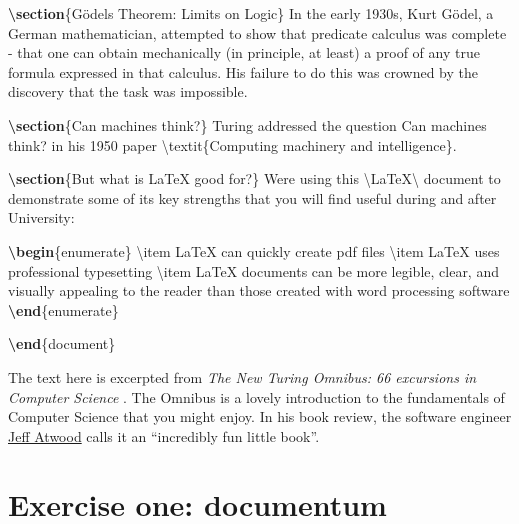 \documentclass[
]{book}
\newenvironment{Shaded}{\begin{snugshade}}{\end{snugshade}}
\newcommand{\ExtensionTok}[1]{#1}
\newcommand{\FunctionTok}[1]{\textcolor[rgb]{0.00,0.00,0.00}{#1}}
\newcommand{\KeywordTok}[1]{\textcolor[rgb]{0.13,0.29,0.53}{\textbf{#1}}}
\newcommand{\NormalTok}[1]{#1}
\begin{document}
\begin{Shaded}
\begin{Highlighting}[]
\KeywordTok{\textbackslash{}section}\NormalTok{\{Gödel\textquotesingle{}s Theorem: Limits on Logic\}}
\NormalTok{In the early 1930\textquotesingle{}s, Kurt Gödel, a German mathematician, attempted to show that predicate calculus was complete {-} that one can obtain mechanically  (in principle, at least) a proof of any true formula expressed in that calculus. His failure to do this was crowned by the discovery that the task was impossible.}

\KeywordTok{\textbackslash{}section}\NormalTok{\{Can machines think?\}}
\NormalTok{Turing addressed the question \textasciigrave{}\textasciigrave{}Can machines think?\textquotesingle{}\textquotesingle{} in his 1950 paper }\FunctionTok{\textbackslash{}textit}\NormalTok{\{Computing machinery and intelligence\}.}

\KeywordTok{\textbackslash{}section}\NormalTok{\{But what is LaTeX good for?\}}
\NormalTok{We\textquotesingle{}re using this }\FunctionTok{\textbackslash{}LaTeX\textbackslash{} }\NormalTok{document to demonstrate some of its key strengths that you will find useful during and after University:}

\KeywordTok{\textbackslash{}begin}\NormalTok{\{}\ExtensionTok{enumerate}\NormalTok{\}}
\FunctionTok{\textbackslash{}item}\NormalTok{ LaTeX can quickly create pdf files}
\FunctionTok{\textbackslash{}item}\NormalTok{ LaTeX uses professional typesetting}
\FunctionTok{\textbackslash{}item}\NormalTok{ LaTeX documents can be more legible, clear, and visually appealing to the reader than those created with word processing software}
\KeywordTok{\textbackslash{}end}\NormalTok{\{}\ExtensionTok{enumerate}\NormalTok{\}}

\KeywordTok{\textbackslash{}end}\NormalTok{\{}\ExtensionTok{document}\NormalTok{\}}
\end{Highlighting}
\end{Shaded}

The text here is excerpted from \emph{The New Turing Omnibus: 66 excursions in Computer Science} \citep{turingomnibus}. The Omnibus is a lovely introduction to the fundamentals of Computer Science that you might enjoy. In his book review, the software engineer \href{https://en.wikipedia.org/wiki/Jeff_Atwood}{Jeff Atwood} calls it an ``incredibly fun little book''. \citep{codinghorror}

\hypertarget{ex1}{%
\section{Exercise one: documentum}\label{ex1}}
\end{document}
